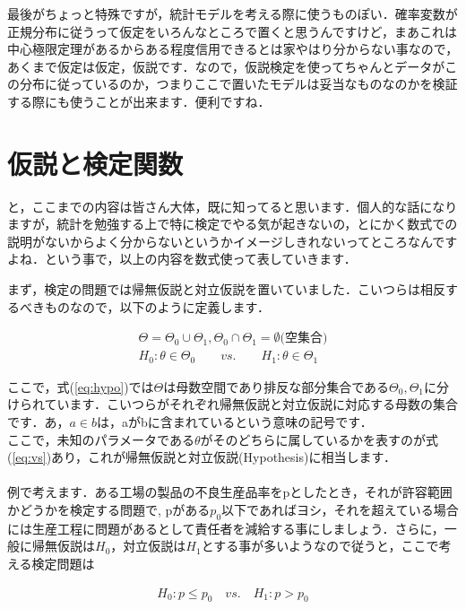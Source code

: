 \documentclass[11pt,a4paper]{ujreport} 	%
\begin{document}
最後がちょっと特殊ですが，統計モデルを考える際に使うものぽい．確率変数が正規分布に従うって仮定をいろんなところで置くと思うんですけど，まあこれは中心極限定理があるからある程度信用できるとは家やはり分からない事なので，あくまで仮定は仮定，仮説です．なので，仮説検定を使ってちゃんとデータがこの分布に従っているのか，つまりここで置いたモデルは妥当なものなのかを検証する際にも使うことが出来ます．便利ですね．

\section{仮説と検定関数}
と，ここまでの内容は皆さん大体，既に知ってると思います．個人的な話になりますが，統計を勉強する上で特に検定でやる気が起きないの，とにかく数式での説明がないからよく分からないというかイメージしきれないってところなんですよね．という事で，以上の内容を数式使って表していきます．

まず，検定の問題では帰無仮説と対立仮説を置いていました．こいつらは相反するべきものなので，以下のように定義します．

\begin{align}
  \Theta = \Theta_0 \cup \Theta_1, \Theta_0 \cap \Theta_1 = \emptyset \text{(空集合)}
  \label{eq:hypo}\\
  H_0: \theta \in \Theta_0 \qquad vs. \qquad H_1:\theta \in \Theta_1
  \label{eq:vs}
\end{align}

ここで，式(\ref{eq:hypo})では$\Theta$は母数空間であり排反な部分集合である$\Theta_0, \Theta_1$に分けられています．こいつらがそれぞれ帰無仮説と対立仮説に対応する母数の集合です．あ，$a \in b$は，aがbに含まれているという意味の記号です．\\

ここで，未知のパラメータである$\theta$がそのどちらに属しているかを表すのが式(\ref{eq:vs})あり，これが帰無仮説と対立仮説(Hypothesis)に相当します．\\\\

例で考えます．ある工場の製品の不良生産品率をpとしたとき，それが許容範囲かどうかを検定する問題で, pがある$p_0$以下であればヨシ，それを超えている場合には生産工程に問題があるとして責任者を減給する事にしましょう．さらに，一般に帰無仮説は$H_0$，対立仮説は$H_1$とする事が多いようなので従うと，ここで考える検定問題は

\begin{align}
 H_0 :p\leq p_0 \quad vs. \quad H_1 :p> p_0 
\end{align}
\end{document}
